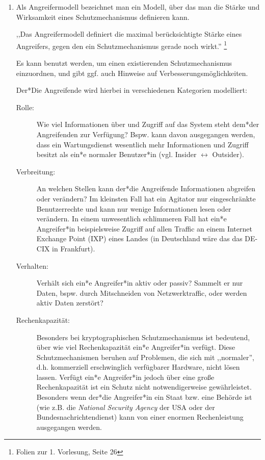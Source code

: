 \documentclass[a4paper,11pt]{scrartcl}
\begin{document}
\begin{enumerate}[1.]
    \item
        Als Angreifermodell bezeichnet man ein Modell, über das man die
        Stärke und Wirksamkeit eines Schutzmechanismus definieren kann.

        \begin{displayquote}
            ,,Das Angreifermodell definiert die maximal berücksichtigte Stärke eines
            Angreifers, gegen den ein Schutzmechanismus gerade noch wirkt.''%
            \footnote{Folien zur 1. Vorlesung, Seite 26}
        \end{displayquote}

        Es kann benutzt werden, um einen existierenden Schutzmechanismus
        einzuordnen, und gibt ggf. auch Hinweise auf
        Verbesserungsmöglichkeiten.

        Der*Die Angreifende wird hierbei in verschiedenen Kategorien modelliert:

        \begin{description}
            \item[Rolle:]
                Wie viel Informationen über und Zugriff auf das System steht dem*der
                Angreifenden zur Verfügung? Bspw. kann davon ausgegangen werden,
                dass ein Wartungsdienst wesentlich mehr Informationen und
                Zugriff besitzt als ein*e normaler Benutzer*in (vgl. Insider $\leftrightarrow$ Outsider).
            \item[Verbreitung:]
                An welchen Stellen kann der*die Angreifende Informationen abgreifen
                oder verändern? Im kleinsten Fall hat ein Agitator nur
                eingeschränkte Benutzerrechte und kann nur wenige Informationen
                lesen oder verändern. In einem unwesentlich schlimmeren Fall
                hat ein*e Angreifer*in beispielsweise Zugriff auf allen Traffic an
                einem Internet Exchange Point (IXP) eines Landes (in Deutschland
                wäre das das DE-CIX in Frankfurt).
            \item[Verhalten:]
                Verhält sich ein*e Angreifer*in aktiv oder passiv? Sammelt er nur
                Daten, bspw. durch Mitschneiden von Netzwerktraffic, oder werden
                aktiv Daten zerstört?
            \item[Rechenkapazität:]
                Besonders bei kryptographischen Schutzmechanismus ist bedeutend,
                über wie viel Rechenkapazität ein*e Angreifer*in verfügt. Diese
                Schutzmechanismen beruhen auf Problemen, die sich mit ,,normaler'',
                d.h. kommerziell erschwinglich verfügbarer Hardware,  nicht
                lösen lassen. Verfügt ein*e Angreifer*in jedoch über eine große
                Rechenkapazität ist ein Schutz nicht notwendigerweise gewährleistet.
                Besonders wenn der*die Angreifer*in ein Staat bzw. eine Behörde ist
                (wie z.B. die \textit{National Security Agency} der USA oder der
                Bundesnachrichtendienst) kann von einer enormen Rechenleistung
                ausgegangen werden.
         \end{description}


\end{enumerate}
\end{document}
